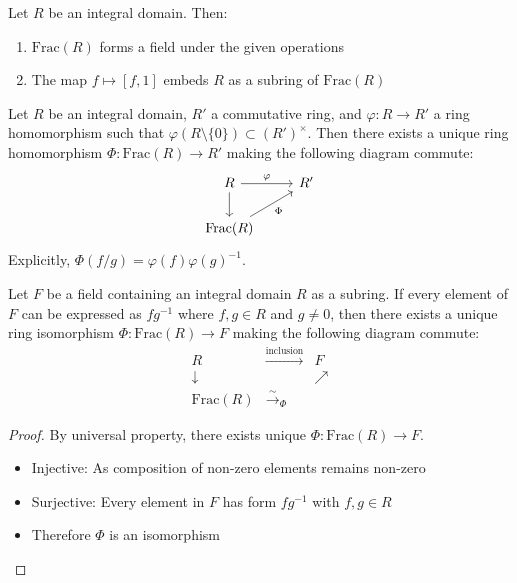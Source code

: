\begin{proposition}
  Let $R$ be an integral domain. Then:
  \begin{enumerate}
    \item $\text{Frac}(R)$ forms a field under the given operations
    \item The map $f \mapsto [f,1]$ embeds $R$ as a subring of $\text{Frac}(R)$
  \end{enumerate}
\end{proposition}

\begin{proposition}
  Let $R$ be an integral domain, $R'$ a commutative ring, and $\varphi : R \to R'$ a ring homomorphism such that $\varphi(R \setminus \{0\}) \subset (R')^\times$. Then there exists a unique ring homomorphism $\Phi : \text{Frac}(R) \to R'$ making the following diagram commute:
  \[
    \begin{tikzcd}
      R \arrow[r, "\varphi"]  \arrow[d] & R' \\
      \text{Frac}(R) \arrow[ru, "\Phi"'] &
    \end{tikzcd}
  \]
  Explicitly, $\Phi(f/g) = \varphi(f)\varphi(g)^{-1}$.
\end{proposition}

\begin{corollary}
  Let $F$ be a field containing an integral domain $R$ as a subring. If every element of $F$ can be expressed as $fg^{-1}$ where $f,g \in R$ and $g \neq 0$, then there exists a unique ring isomorphism $\Phi : \text{Frac}(R) \to F$ making the following diagram commute:
  \[
    \begin{matrix}
      R & \xrightarrow{\text{inclusion}} & F \\
      \downarrow & & \nearrow \\
      \text{Frac}(R) & \xrightarrow{\sim}_{\Phi} &
    \end{matrix}
  \]
\end{corollary}

\begin{proof}
  By universal property, there exists unique $\Phi : \text{Frac}(R) \to F$.
  \begin{itemize}
    \item Injective: As composition of non-zero elements remains non-zero
    \item Surjective: Every element in $F$ has form $fg^{-1}$ with $f,g \in R$
    \item Therefore $\Phi$ is an isomorphism
  \end{itemize}
\end{proof}


